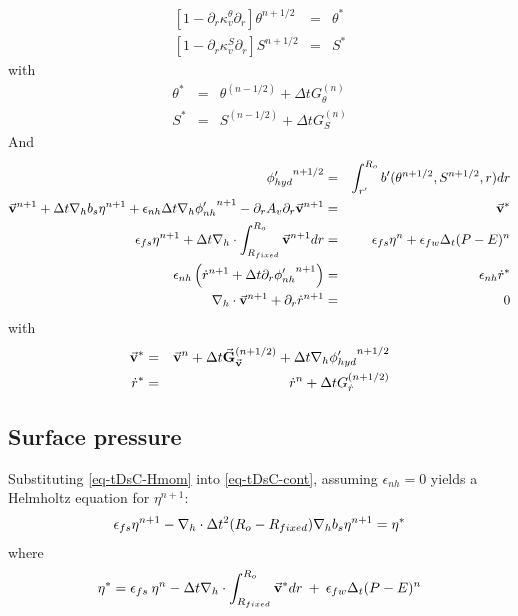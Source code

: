 \begin{eqnarray*}
\left[ 1 - \partial_r \kappa_v^\theta \partial_r \right]
\theta^{n+1/2} & = & \theta^*
\\
\left[ 1 - \partial_r \kappa_v^S \partial_r \right]
S^{n+1/2} & = & S^*
\end{eqnarray*}
with
\begin{eqnarray*}
\theta^* & = &
\theta ^{(n-1/2)} + \Delta t G_{\theta} ^{(n)}
\\
S^* & = &
S ^{(n-1/2)} + \Delta t G_{S} ^{(n)}
\end{eqnarray*}
And 
\begin{eqnarray*}
{\phi'_{hyd}}^{n+1/2} & = & \int_{r'}^{R_o} b'(\theta^{n+1/2},S^{n+1/2},r) dr
\\
\vec{\bf v} ^{n+1}
+ \Delta t {\bf \nabla}_h b_s {\eta}^{n+1}
+ \epsilon_{nh} \Delta t {\bf \nabla}_h {\phi'_{nh}}^{n+1}
- \partial_r A_v \partial_r \vec{\bf v}^{n+1}
& = &
\vec{\bf v}^*
\\
\epsilon_{fs} {\eta}^{n+1} + \Delta t
{\bf \nabla}_h \cdot \int_{R_{fixed}}^{R_o} \vec{\bf v}^{n+1} dr
& = & 
\epsilon_{fs} {\eta}^{n} + \epsilon_{fw} \Delta_t (P-E)^{n} 
\\
\epsilon_{nh} \left( \dot{r} ^{n+1}
+ \Delta t \partial_r {\phi'_{nh}} ^{n+1}
\right)
& = & \epsilon_{nh} \dot{r}^*
\\
{\bf \nabla}_h \cdot \vec{\bf v}^{n+1} + \partial_r \dot{r}^{n+1}
& = & 0
\end{eqnarray*}
with
\begin{eqnarray*}
\vec{\bf v}^* & = &
\vec{\bf v} ^{n} + \Delta t \vec{\bf G}_{\vec{\bf v}} ^{(n+1/2)}
+ \Delta t  {\bf \nabla}_h {\phi'_{hyd}}^{n+1/2}
\\
\dot{r}^* & = &
\dot{r} ^{n} + \Delta t G_{\dot{r}} ^{(n+1/2)}
\end{eqnarray*}


\subsection{Surface pressure}

Substituting \ref{eq-tDsC-Hmom} into \ref{eq-tDsC-cont}, assuming
$\epsilon_{nh} = 0$ yields a Helmholtz equation for ${\eta}^{n+1}$:
\begin{eqnarray}
\epsilon_{fs} {\eta}^{n+1} -
{\bf \nabla}_h \cdot \Delta t^2 (R_o-R_{fixed})
{\bf \nabla}_h b_s {\eta}^{n+1}
= {\eta}^*
\label{eq-solve2D}
\end{eqnarray}
where
\begin{eqnarray}
{\eta}^* = \epsilon_{fs} \: {\eta}^{n} -
\Delta t {\bf \nabla}_h \cdot \int_{R_{fixed}}^{R_o} \vec{\bf v}^* dr
\: + \: \epsilon_{fw} \Delta_t (P-E)^{n} 
\label{eq-solve2D_rhs}
\end{eqnarray}

